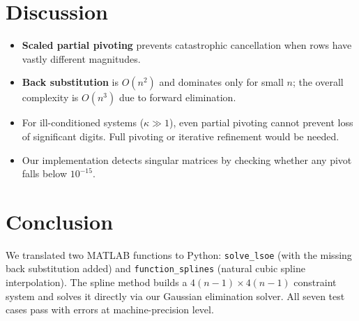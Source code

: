\documentclass[letterpaper,twocolumn,fleqn]{article}
\begin{document}
\section{Discussion}
\begin{itemize}
  \item \textbf{Scaled partial pivoting} prevents catastrophic
        cancellation when rows have vastly different magnitudes.
  \item \textbf{Back substitution} is $O(n^2)$ and dominates only
        for small $n$; the overall complexity is $O(n^3)$ due to
        forward elimination.
  \item For ill-conditioned systems ($\kappa \gg 1$), even partial
        pivoting cannot prevent loss of significant digits.
        Full pivoting or iterative refinement would be needed.
  \item Our implementation detects singular matrices by checking
        whether any pivot falls below $10^{-15}$.
\end{itemize}

\section{Conclusion}
We translated two MATLAB functions to Python: \texttt{solve\_lsoe}
(with the missing back substitution added) and \texttt{function\_splines}
(natural cubic spline interpolation).  The spline method builds a
$4(n{-}1) \times 4(n{-}1)$ constraint system and solves it directly
via our Gaussian elimination solver.  All seven test cases pass
with errors at machine-precision level.
\end{document}
